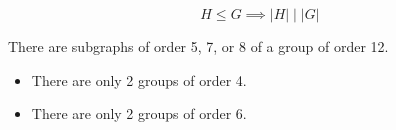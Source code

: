 \begin{frame}
  \[
    H \le G \implies |H| \mid |G|
  \]

  \pause
  \vspace{0.50cm}
  \begin{center}
    There are  subgraphs of order 5, 7, or 8 of a group of order 12.
  \end{center}

  \pause
  \vspace{0.50cm}
  \begin{theorem}
    \begin{itemize}
      \item There are only 2 groups of order 4.
      \item There are only 2 groups of order 6.
    \end{itemize}
  \end{theorem}
\end{frame}
